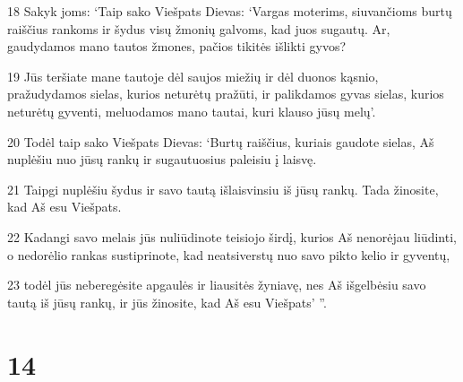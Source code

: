 \par 18 Sakyk joms: ‘Taip sako Viešpats Dievas: ‘Vargas moterims, siuvančioms burtų raiščius rankoms ir šydus visų žmonių galvoms, kad juos sugautų. Ar, gaudydamos mano tautos žmones, pačios tikitės išlikti gyvos? 
\par 19 Jūs teršiate mane tautoje dėl saujos miežių ir dėl duonos kąsnio, pražudydamos sielas, kurios neturėtų pražūti, ir palikdamos gyvas sielas, kurios neturėtų gyventi, meluodamos mano tautai, kuri klauso jūsų melų’. 
\par 20 Todėl taip sako Viešpats Dievas: ‘Burtų raiščius, kuriais gaudote sielas, Aš nuplėšiu nuo jūsų rankų ir sugautuosius paleisiu į laisvę. 
\par 21 Taipgi nuplėšiu šydus ir savo tautą išlaisvinsiu iš jūsų rankų. Tada žinosite, kad Aš esu Viešpats. 
\par 22 Kadangi savo melais jūs nuliūdinote teisiojo širdį, kurios Aš nenorėjau liūdinti, o nedorėlio rankas sustiprinote, kad neatsiverstų nuo savo pikto kelio ir gyventų, 
\par 23 todėl jūs neberegėsite apgaulės ir liausitės žyniavę, nes Aš išgelbėsiu savo tautą iš jūsų rankų, ir jūs žinosite, kad Aš esu Viešpats’ ”.



\chapter{14}


